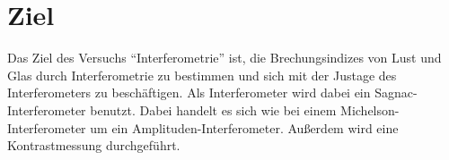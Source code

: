 \section{Ziel}
\label{sec:Ziel}

Das Ziel des Versuchs \enquote{Interferometrie} ist, die Brechungsindizes von Lust und Glas durch Interferometrie zu bestimmen und sich mit der Justage des Interferometers zu beschäftigen.
Als Interferometer wird dabei ein Sagnac-Interferometer benutzt.
Dabei handelt es sich wie bei einem Michelson-Interferometer um ein Amplituden-Interferometer.
Außerdem wird eine Kontrastmessung durchgeführt.